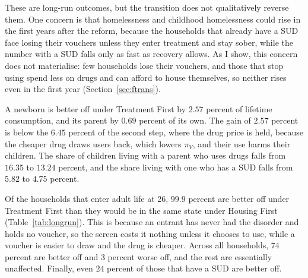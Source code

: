 \documentclass[10pt]{article}
\newif\ifshowupdates \showupdatesfalse
\newcommand{\updnum}[1]{\ifshowupdates{\color{blue}#1}\else#1\fi}
\begin{document}
\updnum{These are long-run outcomes, but the transition does not qualitatively reverse them. One concern is that homelessness and childhood homelessness could rise in the first years after the reform, because the households that already have a SUD face losing their vouchers unless they enter treatment and stay sober, while the number with a SUD falls only as fast as recovery allows. As I show, this concern does not materialise: few households lose their vouchers, and those that stop using spend less on drugs and can afford to house themselves, so neither rises even in the first year (Section~\ref{sec:ftrans}).}

A newborn is better off under Treatment First by $2.57$ percent of lifetime consumption, and its parent by $0.69$ percent of its own. The gain of $2.57$ percent is below the $6.45$ percent of the second step, where the drug price is held, because the cheaper drug draws users back, which lowers $\pi_V$, and their use harms their children. The share of children living with a parent who uses drugs falls from $16.35$ to $13.24$ percent, and the share living with one who has a SUD falls from $5.82$ to $4.75$ percent.

Of the households that enter adult life at 26, $99.9$ percent are better off under Treatment First than they would be in the same state under Housing First (Table~\ref{tab:longrun}). This is because an entrant has never had the disorder and holds no voucher, so the screen costs it nothing unless it chooses to use, while a voucher is easier to draw and the drug is cheaper.  Across all households, $74$ percent are better off and $3$ percent worse off, and the rest are essentially unaffected. Finally, even $24$ percent of those that have a SUD are better off.
\end{document}
